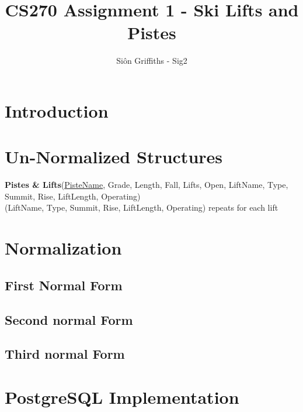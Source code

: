 \documentclass[titlepage ,12pt]{article}
\title{CS270 Assignment 1 - Ski Lifts and Pistes}
\author{Si\^{o}n Griffiths - Sig2}
\begin{document}
\maketitle
\newpage
\tableofcontents
\clearpage


\section{Introduction}

\section{Un-Normalized Structures}
\textbf{Pistes \& Lifts}(\underline{PisteName}, Grade, Length, Fall, Lifts, Open, LiftName, Type, Summit, Rise, LiftLength, Operating) \\
(LiftName, Type, Summit, Rise, LiftLength, Operating) repeats for each lift
 \newline

\section{Normalization}
\subsection{First Normal Form}
\subsection{Second normal Form}
\subsection{Third normal Form}

\section{PostgreSQL Implementation}
\end{document}
